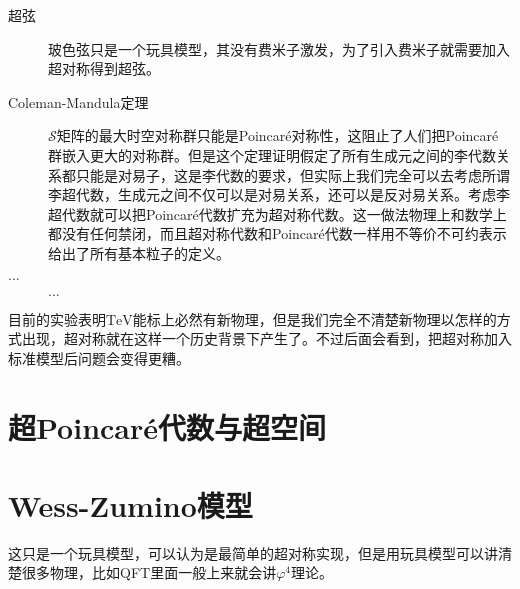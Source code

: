 \begin{description}
	\item[超弦]玻色弦只是一个玩具模型，其没有费米子激发，为了引入费米子就需要加入超对称得到超弦。
	\item[Coleman-Mandula定理] $\mathcal S$矩阵的最大时空对称群只能是Poincar\'e对称性，这阻止了人们把Poincar\'e群嵌入更大的对称群\cite{PhysRev.159.1251}。但是这个定理证明假定了所有生成元之间的李代数关系都只能是对易子，这是李代数的要求，但实际上我们完全可以去考虑所谓李超代数\cite{superlie}，生成元之间不仅可以是对易关系，还可以是反对易关系。考虑李超代数就可以把Poincar\'e代数扩充为超对称代数\cite{Haag:1974qh}。这一做法物理上和数学上都没有任何禁闭，而且超对称代数和Poincar\'e代数一样用不等价不可约表示给出了所有基本粒子的定义。
	\item [$\ldots$]$\ldots$
\end{description}

\PRLsep

目前的实验表明$\mathrm{TeV}$能标上必然有新物理，但是我们完全不清楚新物理以怎样的方式出现，超对称就在这样一个历史背景下产生了。不过后面会看到，把超对称加入标准模型后问题会变得更糟。

\section{超Poincar\'e代数与超空间}


\section{Wess-Zumino模型}
这只是一个玩具模型，可以认为是最简单的超对称实现，但是用玩具模型可以讲清楚很多物理，比如QFT里面一般上来就会讲$\varphi^4$理论。